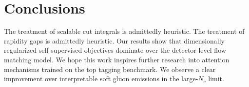 \section{Conclusions}\label{sec:conclusions}

The treatment of scalable cut integrals is admittedly heuristic. The
treatment of rapidity gaps is admittedly heuristic. Our results show
that dimensionally regularized self-supervised objectives dominate over
the detector-level flow matching model. We hope this work inspires
further research into attention mechanisms trained on the top tagging
benchmark. We observe a clear improvement over interpretable soft gluon
emissions in the large-$N_c$ limit.

